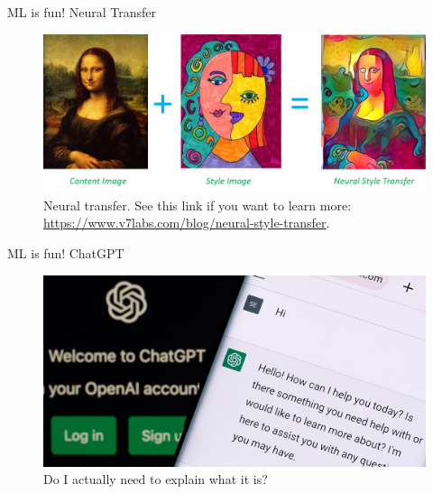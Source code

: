 \documentclass{beamer}
\begin{document}
     \begin{frame}{ML is fun! Neural Transfer}
	    \begin{figure}
        \centering
            \includegraphics[width=\textwidth]{images/presentation/neural-transfer.png}
            \caption{Neural transfer. See this link if you want to learn more: \href{https://www.v7labs.com/blog/neural-style-transfer}{https://www.v7labs.com/blog/neural-style-transfer}.}
        \end{figure}
	\end{frame}

     \begin{frame}{ML is fun! ChatGPT}
	    \begin{figure}
        \centering
            \includegraphics[width=\textwidth]{images/presentation/chatgpt.jpg}
            \caption{Do I actually need to explain what it is?}
        \end{figure}
	\end{frame}
\end{document}
